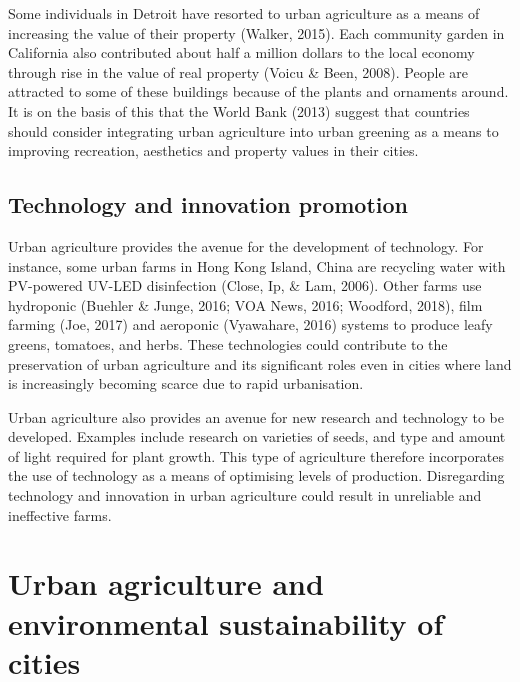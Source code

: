 Some individuals in Detroit have resorted to urban agriculture as a means of increasing the value of their property (Walker, 2015). Each community garden in California also contributed about half a million dollars to the local economy through rise in the value of real property (Voicu & Been, 2008). People are attracted to some of these buildings because of the plants and ornaments around. It is on the basis of this that the World Bank (2013) suggest that countries should consider integrating urban agriculture into urban greening as a means to improving recreation, aesthetics and property values in their cities.

\subsection{Technology and innovation promotion}

Urban agriculture provides the avenue for the development of technology. For instance, some urban farms in Hong Kong Island, China are recycling water with PV-powered UV-LED disinfection (Close, Ip, & Lam, 2006). Other farms use hydroponic (Buehler & Junge, 2016; VOA News, 2016; Woodford, 2018), film farming (Joe, 2017) and aeroponic (Vyawahare, 2016) systems to produce leafy greens, tomatoes, and herbs. These technologies could contribute to the preservation of urban agriculture and its significant roles even in cities where land is increasingly becoming scarce due to rapid urbanisation.

Urban agriculture also provides an avenue for new research and technology to be developed. Examples include research on varieties of seeds, and type and amount of light required for plant growth. This type of agriculture therefore incorporates the use of technology as a means of optimising levels of production. Disregarding technology and innovation in urban agriculture could result in unreliable and ineffective farms.

\section{Urban agriculture and environmental sustainability of cities}




